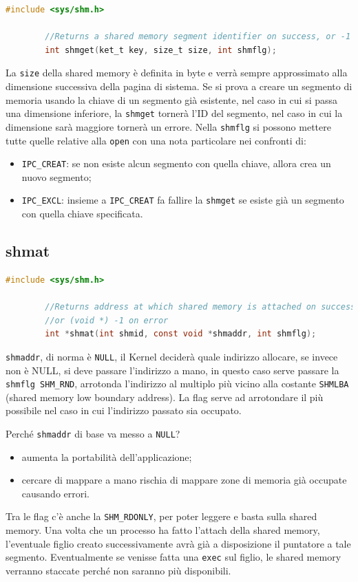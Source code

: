 \documentclass[a4paper, 12pt]{book}
\begin{document}
    \begin{lstlisting}[language=C]
        #include <sys/shm.h>

        //Returns a shared memory segment identifier on success, or -1 on error  
        int shmget(ket_t key, size_t size, int shmflg);
    \end{lstlisting}
    La \verb|size| della shared memory è definita in byte
    e verrà sempre approssimato alla dimensione successiva 
    della pagina di sistema. Se si prova a creare un 
    segmento di memoria usando la chiave di un segmento 
    già esistente, nel caso in cui si passa una dimensione 
    inferiore, la \verb|shmget| tornerà l'ID del segmento,
    nel caso in cui la dimensione sarà maggiore tornerà 
    un errore. Nella \verb|shmflg| si possono mettere tutte 
    quelle relative alla \verb|open| con una nota particolare 
    nei confronti di:
    \begin{itemize}
        \item \verb|IPC_CREAT|: se non esiste alcun segmento 
        con quella chiave, allora crea un nuovo segmento;
        \item \verb|IPC_EXCL|: insieme a \verb|IPC_CREAT| 
        fa fallire la \verb|shmget| se esiste già un segmento 
        con quella chiave specificata.
    \end{itemize}
    
    \subsection{shmat}

    \begin{lstlisting}[language=C]
        #include <sys/shm.h>

        //Returns address at which shared memory is attached on success
        //or (void *) -1 on error  
        int *shmat(int shmid, const void *shmaddr, int shmflg);
    \end{lstlisting}
    \verb|shmaddr|, di norma è \verb|NULL|, il Kernel 
    deciderà quale indirizzo allocare, se invece non è 
    NULL, si deve passare l'indirizzo a mano, in questo caso 
    serve passare la \verb|shmflg SHM_RND|, arrotonda 
    l'indirizzo al multiplo più vicino alla costante 
    \verb|SHMLBA| (shared memory low boundary address).
    La flag serve ad arrotondare il più possibile nel 
    caso in cui l'indirizzo passato sia occupato.

    Perché \verb|shmaddr| di base va messo a \verb|NULL|?
    \begin{itemize}
        \item aumenta la portabilità dell'applicazione;
        \item cercare di mappare a mano rischia di mappare 
        zone di memoria già occupate causando errori.
    \end{itemize}
    Tra le flag c'è anche la \verb|SHM_RDONLY|, per poter 
    leggere e basta sulla shared memory. Una volta che un 
    processo ha fatto l'attach della shared memory, 
    l'eventuale figlio creato successivamente avrà già a 
    disposizione il puntatore a tale segmento. Eventualmente 
    se venisse fatta una \verb|exec| sul figlio, le shared 
    memory verranno staccate perché non saranno più disponibili.
\end{document}

